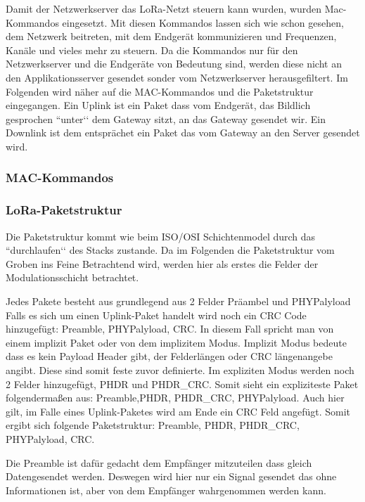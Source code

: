 \documentclass[a4paper,12pt]{article}
\begin{document}
            Damit der Netzwerkserver das LoRa-Netzt steuern kann wurden, wurden Mac-Kommandos eingesetzt. Mit diesen 
            Kommandos lassen sich wie schon gesehen, dem Netzwerk beitreten, mit dem Endgerät kommunizieren und 
            Frequenzen, Kanäle und vieles mehr zu steuern.
            Da die Kommandos nur für den Netzwerkserver und die Endgeräte von Bedeutung sind, werden diese nicht an 
            den Applikationsserver gesendet sonder vom Netzwerkserver herausgefiltert. Im Folgenden wird näher auf 
            die MAC-Kommandos und die Paketstruktur eingegangen.
            Ein Uplink ist ein Paket dass vom Endgerät, das Bildlich gesprochen ``unter‘‘ dem Gateway sitzt, an das 
            Gateway gesendet wir. Ein Downlink ist dem entsprächet ein Paket das vom Gateway an den Server gesendet 
            wird.
            \subsubsection{MAC-Kommandos}
            \subsubsection{LoRa-Paketstruktur}
            Die Paketstruktur kommt wie beim ISO/OSI Schichtenmodel durch das ``durchlaufen‘‘ des Stacks zustande. 
            Da im Folgenden die Paketstruktur vom Groben ins Feine Betrachtend wird, werden hier als erstes die Felder
            der Modulationsschicht betrachtet.

            Jedes Pakete besteht aus grundlegend aus 2 Felder Präambel und  PHYPalyload Falls es sich um einen 
            Uplink-Paket handelt wird noch ein CRC Code hinzugefügt: Preamble, PHYPalyload, CRC. 
            In diesem Fall spricht man von einem implizit Paket oder von dem implizitem Modus. Implizit Modus bedeute 
            dass es kein Payload Header gibt, der Felderlängen oder CRC längenangebe angibt. Diese sind somit feste 
            zuvor definierte. Im expliziten Modus werden noch 2 Felder hinzugefügt, PHDR und PHDR\_CRC. Somit sieht 
            ein expliziteste Paket folgendermaßen aus:  Preamble,PHDR, PHDR\_CRC, PHYPalyload. Auch hier gilt, im Falle
             eines Uplink-Paketes wird am Ende ein CRC Feld angefügt. Somit ergibt sich folgende Paketstruktur: 
             Preamble, PHDR, PHDR\_CRC, PHYPalyload, CRC.

            Die Preamble ist dafür gedacht dem Empfänger mitzuteilen dass gleich Datengesendet werden. Deswegen wird 
            hier nur ein Signal gesendet das ohne Informationen ist, aber von dem Empfänger wahrgenommen werden kann.
\end{document}
